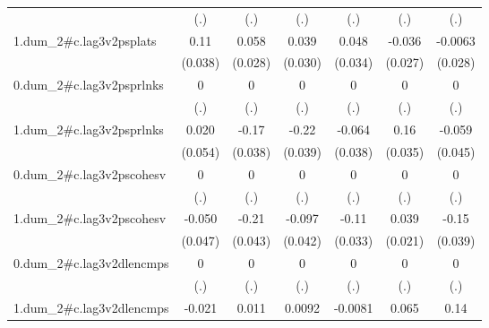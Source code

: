 \begin{table}[htbp]
\begin{tabular}{l*{6}{c}}
            &         (.)         &         (.)         &         (.)         &         (.)         &         (.)         &         (.)         \\
[1em]
1.dum\_2#c.lag3v2psplats&        0.11\sym{**} &       0.058\sym{*}  &       0.039         &       0.048         &      -0.036         &     -0.0063         \\
            &     (0.038)         &     (0.028)         &     (0.030)         &     (0.034)         &     (0.027)         &     (0.028)         \\
[1em]
0.dum\_2#c.lag3v2psprlnks&           0         &           0         &           0         &           0         &           0         &           0         \\
            &         (.)         &         (.)         &         (.)         &         (.)         &         (.)         &         (.)         \\
[1em]
1.dum\_2#c.lag3v2psprlnks&       0.020         &       -0.17\sym{***}&       -0.22\sym{***}&      -0.064         &        0.16\sym{***}&      -0.059         \\
            &     (0.054)         &     (0.038)         &     (0.039)         &     (0.038)         &     (0.035)         &     (0.045)         \\
[1em]
0.dum\_2#c.lag3v2pscohesv&           0         &           0         &           0         &           0         &           0         &           0         \\
            &         (.)         &         (.)         &         (.)         &         (.)         &         (.)         &         (.)         \\
[1em]
1.dum\_2#c.lag3v2pscohesv&      -0.050         &       -0.21\sym{***}&      -0.097\sym{*}  &       -0.11\sym{***}&       0.039         &       -0.15\sym{***}\\
            &     (0.047)         &     (0.043)         &     (0.042)         &     (0.033)         &     (0.021)         &     (0.039)         \\
[1em]
0.dum\_2#c.lag3v2dlencmps&           0         &           0         &           0         &           0         &           0         &           0         \\
            &         (.)         &         (.)         &         (.)         &         (.)         &         (.)         &         (.)         \\
[1em]
1.dum\_2#c.lag3v2dlencmps&      -0.021         &       0.011         &      0.0092         &     -0.0081         &       0.065\sym{**} &        0.14\sym{***}\\

\end{tabular}
\end{table}
